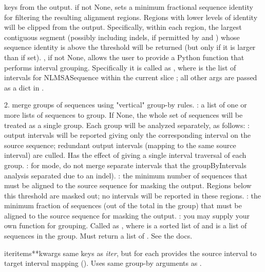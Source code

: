 \documentclass{howto}
\begin{document}
\begin{funcdesc}{keys}
  from the output.  
   if not None, sets a minimum fractional sequence identity
  for filtering the resulting alignment regions.  Regions with lower levels
  of identity will be clipped from the output.  Specifically, within each
  region, the largest contiguous segment (possibly including indels, if
  permitted by  and ) whose sequence identity is above the
  threshold will be returned (but only if it is larger than 
  if set).  
  ,
  if not None, allows the user to provide a Python function that performs
  interval grouping.  Specifically it is called as
  , where  is the
  list of intervals for NLMSASequence  within the current slice 
  ; all other args are passed as a dict in .

  2. merge groups of sequences using "vertical" group-by rules.
  : a list of one or more lists of sequences to group.
  If None, the whole set of sequences will be treated as a single group.
  Each group will be analyzed separately, as follows:
  : output intervals will be reported giving only
  the corresponding interval on the source sequence; redundant
  output intervals (mapping to the same source interval) are
  culled.  Has the effect of giving a single interval traversal
  of each group.
  : for  mode, do not merge separate 
  intervals that the groupByIntervals analysis separated due to an indel).
  : the minimum number of sequences that must be aligned to
  the source sequence for masking the output.  Regions below
  this threshold are masked out; no intervals will be reported
  in these regions.
  : the minimum fraction of sequences (out of the
  total in the group) that must be aligned to the source
  sequence for masking the output.
  : you may supply your own function for grouping.
  Called as , where
   is a sorted list of
  and  is a list of sequences in the group.
  Must return a list of .  See the docs.

\end{funcdesc}


\begin{funcdesc}{iteritems}{**kwargs}
  same keys as {\em iter}, but for each provides the source interval
  to target interval mapping ().
  Uses same group-by arguments as .
\end{funcdesc}
\end{document}
